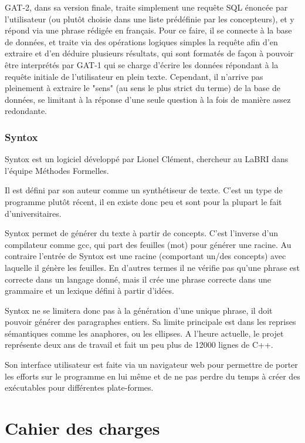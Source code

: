\documentclass[12pt]{report}
\begin{document}
GAT-2, dans sa version finale, traite simplement une requête SQL énoncée par l'utilisateur (ou plutôt choisie dans une liste prédéfinie par les concepteurs), et y répond via une phrase rédigée en français. Pour ce faire, il se connecte à la base de données, et traite via des opérations logiques simples la requête afin d'en extraire et d'en déduire plusieurs résultats, qui sont formatés de façon à pouvoir être interprétés par GAT-1 qui se charge d'écrire les données répondant à la requête initiale de l'utilisateur en plein texte.
Cependant, il n'arrive pas pleinement à extraire le "sens" (au sens le plus strict du terme) de la base de données, se limitant à la réponse d'une seule question à la fois de manière assez redondante.

\subsection{Syntox}

Syntox \cite{Clem12} est un logiciel développé par Lionel Clément, chercheur au LaBRI dans l'équipe Méthodes Formelles.

Il est défini par son auteur comme un synthétiseur de texte. C'est un type de programme plutôt récent, il en existe donc peu et sont pour la plupart le fait d'universitaires.

Syntox permet de générer du texte à partir de concepts. C'est l'inverse d'un compilateur comme gcc, qui part des feuilles (mot) pour générer une racine. Au contraire l'entrée de Syntox est une racine (comportant un/des concepts) avec laquelle il génère les feuilles. En d'autres termes il ne vérifie pas qu'une phrase est correcte dans un langage donné, mais il crée une phrase correcte dans une grammaire et un lexique défini à partir d'idées.

Syntox ne se limitera donc pas à la génération d'une unique phrase, il doit pouvoir générer des paragraphes entiers. Sa limite principale est dans les reprises sémantiques comme les anaphores, ou les ellipses.
A l'heure actuelle, le projet représente deux ans de travail et fait un peu plus de 12000 lignes de C++.

Son interface utilisateur est faite via un navigateur web pour permettre de porter les efforts sur le programme en lui même et de ne pas perdre du temps à créer des exécutables pour différentes plate-formes. 


\chapter{Cahier des charges}
\end{document}
